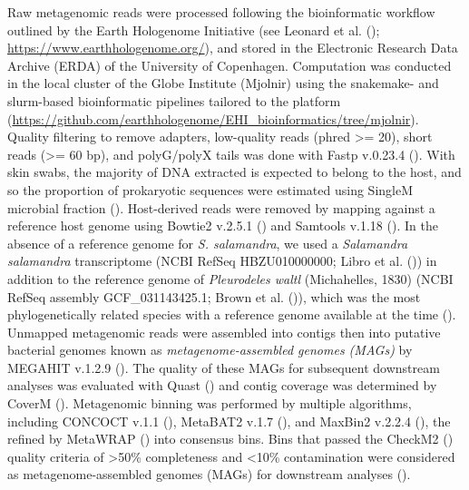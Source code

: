 \documentclass[
  12pt,
]{article}
\begin{document}
Raw metagenomic reads were processed following the bioinformatic
workflow outlined by the Earth Hologenome Initiative (see {Leonard et
al.} ();
\url{https://www.earthhologenome.org/}), and stored in the Electronic
Research Data Archive (ERDA) of the University of Copenhagen.
Computation was conducted in the local cluster of the Globe Institute
(Mjolnir) using the snakemake- and slurm-based bioinformatic pipelines
tailored to the platform
(\url{https://github.com/earthhologenome/EHI_bioinformatics/tree/mjolnir}).
Quality filtering to remove adapters, low-quality reads (phred
\textgreater= 20), short reads (\textgreater= 60 bp), and polyG/polyX
tails was done with Fastp v.0.23.4 (). With skin swabs, the majority of DNA extracted is
expected to belong to the host, and so the proportion of prokaryotic
sequences were estimated using SingleM microbial fraction
().
Host-derived reads were removed by mapping against a reference host
genome using Bowtie2 v.2.5.1 () and Samtools v.1.18
(). In the
absence of a reference genome for \emph{S. salamandra}, we used a
\emph{Salamandra salamandra} transcriptome (NCBI RefSeq HBZU010000000;
Libro et al. ()) in addition to the
reference genome of \emph{Pleurodeles waltl} (Michahelles, 1830) (NCBI
RefSeq assembly GCF\_031143425.1; {Brown et al.}
()), which was the most
phylogenetically related species with a reference genome available at
the time ().
Unmapped metagenomic reads were assembled into contigs then into
putative bacterial genomes known as \emph{metagenome-assembled genomes
(MAGs)} by MEGAHIT v.1.2.9 (). The quality of these MAGs for subsequent downstream analyses was
evaluated with Quast () and contig coverage was determined by CoverM
(). Metagenomic
binning was performed by multiple algorithms, including CONCOCT v.1.1
(), MetaBAT2
v.1.7 (), and MaxBin2
v.2.2.4 (), the refined by
MetaWRAP () into consensus bins. Bins that passed the CheckM2
() quality
criteria of \textgreater50\% completeness and \textless10\%
contamination were considered as metagenome-assembled genomes (MAGs) for
downstream analyses ().
\end{document}
